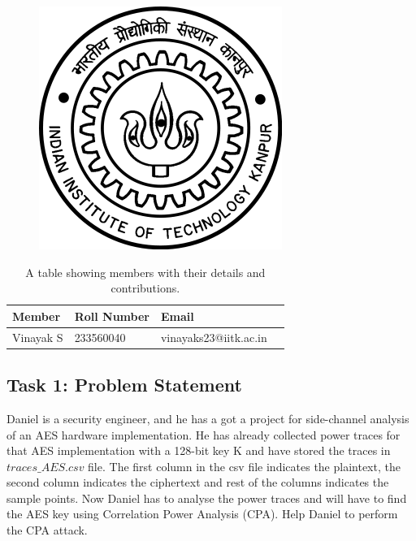 \documentclass[12pt, letterpaper, oneside]{report}
\begin{document}
\begin{titlepage}
\begin{figure}[h]
\centerline{\includegraphics[scale=0.8]{logo.png}}

\label{logo}
\end{figure}
		
\begin{table}[h]
    \centering
    \begin{tabular}{|l|l|l|l|}
        \hline
        \textbf{Member} & \textbf{Roll Number} & \textbf{Email} \\ \hline
        Vinayak S & 233560040 & vinayaks23@iitk.ac.in \\ \hline
    \end{tabular}
    \caption{A table showing members with their details and contributions.}
    \label{tab:members_contribution}
\end{table}

\end{titlepage}

\tableofcontents

\begin{center}
\chapter{Task 1: Problem Statement}
\end{center}
Daniel is a 
security engineer, 
and he has a got a project
for side-channel analysis of
an AES hardware implementation. He has already collected power traces for that
AES implementation with a 128-bit key K and have stored the traces in
$traces\_AES.csv$ file. The first column in the csv file indicates the plaintext, the
second column indicates the ciphertext and rest of the columns indicates the
sample points. Now Daniel has to analyse the power traces and will have to find the
AES key using Correlation Power Analysis (CPA). Help Daniel to perform the CPA
attack.
\end{document}

